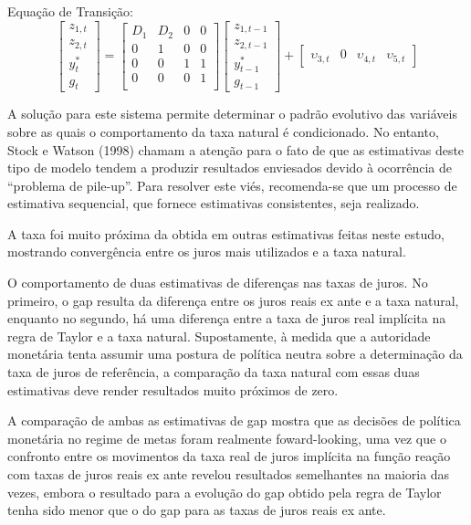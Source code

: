 \documentclass[11pt,oneside,a4paper]{article}
\begin{document}
Equação de Transição:
$$ \begin{bmatrix}
    z_{1,t} \\ z_{2,t} \\ y_{t}^{*} \\ g_t
\end{bmatrix} = \left[ \begin{array}{cccc}
    D_1 & D_2 & 0 & 0  \\
     0  &  1 & 0 & 0  \\
     0  &  0 & 1 & 1  \\
     0  &  0 & 0 & 1  \\
\end{array} \right] \left[ \begin{array}{c}
       z_{1,t-1} \\ z_{2,t-1} \\ y_{t-1}^{*} \\ g_{t-1}
\end{array} \right] + \left[\begin{array}{c}
     \upsilon_{3,t} & 0 & \upsilon_{4,t} & \upsilon_{5,t}
\end{array}  \right]
$$

A solução para este sistema permite determinar o padrão evolutivo das variáveis sobre as quais o comportamento da taxa natural é condicionado. No entanto, Stock e Watson (1998) chamam a atenção para o fato de que as estimativas deste tipo de modelo tendem a produzir resultados enviesados devido à ocorrência de “problema de pile-up”. Para resolver este viés, recomenda-se que um processo de estimativa sequencial, que fornece estimativas consistentes, seja realizado.

A taxa foi muito próxima da obtida em outras estimativas feitas neste estudo, mostrando convergência entre os juros mais utilizados e a taxa natural.

O comportamento de duas estimativas de diferenças nas taxas de juros. No primeiro, o gap resulta da diferença entre os juros reais ex ante e a taxa natural, enquanto no segundo, há uma diferença entre a taxa de juros real implícita na regra de Taylor e a taxa natural. Supostamente, à medida que a autoridade monetária tenta assumir uma postura de política neutra sobre a determinação da taxa de juros de referência, a comparação da taxa natural com essas duas estimativas deve render resultados muito próximos de zero.

A comparação de ambas as estimativas de gap mostra que as decisões de política monetária no regime de metas foram realmente foward-looking, uma vez que o confronto entre os movimentos da taxa real de juros implícita na função reação com taxas de juros reais ex ante revelou resultados semelhantes na maioria das vezes, embora o resultado para a evolução do gap obtido pela regra de Taylor tenha sido menor que o do gap para as taxas de juros reais ex ante.
\end{document}
